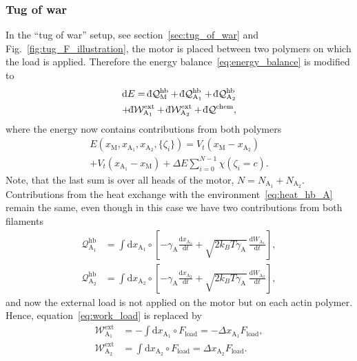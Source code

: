 \documentclass[aps,pre,twocolumn,showpacs,showkeys,superscriptaddress,floatfix]{revtex4-1}
\newcommand{\rmd}{{\mathrm d}}
\newcommand{\dbar}{{\mathchar '26 \mkern-11mu {\mathrm d}}}
\begin{document}
\subsubsection{Tug of war}
In the ``tug of war'' setup, see section~\ref{sec:tug_of_war} and Fig.~\ref{fig:tug_F_illustration},
the motor is placed between two polymers on which the load is applied.
Therefore the energy balance~\eqref{eq:energy_balance} is modified to  
\begin{multline}
\rmd E = \dbar {\mathcal Q}_\text{M}^\text{hb} + \dbar {\mathcal Q}_{\text{A}_1}^\text{hb} + \dbar {\mathcal Q}_{\text{A}_2}^\text{hb} 
\\
+ \dbar {\mathcal W}^\text{ext}_{\text{A}_1} + \dbar {\mathcal W}^\text{ext}_{\text{A}_2} + \dbar {\mathcal Q}^\text{chem}, 
\label{eq:energy_balance_two_filaments}
\end{multline}
where the energy now contains contributions from both polymers
\begin{multline*}
E( x_\text{M}, x_{\text{A}_1}, x_{\text{A}_2}, \{ \zeta_i \}) 
= V_t( x_\text{M} - x_{\text{A}_2} ) 
\\
+ V_t( x_{\text{A}_1} - x_\text{M} ) 
+ \Delta E \sum\limits_{i=0}^{N-1} \chi( \zeta_i = c ) .
\end{multline*}
Note, that the last sum is over all heads of the motor, $N = N_{\text{A}_1} + N_{\text{A}_2}$.
Contributions from the heat exchange with the environment~\eqref{eq:heat_hb_A} remain the same, even though in this case we have two contributions from both filaments
\begin{align*}
{\mathcal Q}_{\text{A}_1}^\text{hb} 
&= \int \rmd x_{\text{A}_1} \circ \left[ - \gamma_\text{A} \frac{\rmd x_{\text{A}_1} }{\rmd t} + \sqrt{ 2 k_B T \gamma_\text{A} } \, \frac{ \rmd W_{\text{A}_1} }{ \rmd t } \right] , \\ 
{\mathcal Q}_{\text{A}_2}^\text{hb} 
&= \int \rmd x_{\text{A}_2} \circ \left[ - \gamma_\text{A} \frac{\rmd x_{\text{A}_2} }{\rmd t} + \sqrt{ 2 k_B T \gamma_\text{A} } \, \frac{ \rmd W_{\text{A}_2} }{ \rmd t } \right] ,
\end{align*}
and now the external load is not applied on the motor but on each actin polymer.
Hence, equation~\eqref{eq:work_load} is replaced by
\begin{align*}
{\mathcal W}^\text{ext}_{\text{A}_1} &= - \int \rmd x_{\text{A}_1} \circ F_\text{load} = - \Delta x_{\text{A}_1} F_\text{load}, 
\\
{\mathcal W}^\text{ext}_{\text{A}_2} &= \int \rmd x_{\text{A}_2} \circ F_\text{load} = \Delta x_{\text{A}_2} F_\text{load}. 
\end{align*}
\end{document}
